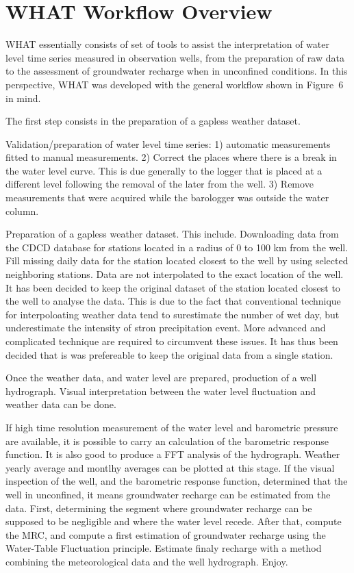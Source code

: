 \documentclass[12pt, letterpaper, fleqn]{report}
\begin{document}
\section{WHAT Workflow Overview}

WHAT essentially consists of set of tools to assist the interpretation of water level time series measured in observation wells, from the preparation of raw data to the assessment of groundwater recharge when in unconfined conditions. In this perspective, WHAT was developed with the general workflow shown in Figure 6  in mind.

The first step consists in the preparation of a gapless weather dataset.

Validation/preparation of water level time series: 1) automatic measurements fitted to manual measurements. 2) Correct the places where there is a break in the water level curve. This is due generally to the logger that is placed at a different level following the removal of the later from the well. 3) Remove measurements that were acquired while the barologger was outside the water column.

Preparation of a gapless weather dataset. This include. Downloading data from the CDCD database for stations located in a radius of 0 to 100 km from the well. Fill missing daily data for the station located closest to the well by using selected neighboring stations. Data are not interpolated to the exact location of the well. It has been decided to keep the original dataset of the station located closest to the well to analyse the data. This is due to the fact that conventional technique for interpoloating weather data tend to surestimate the number of wet day, but underestimate the intensity of stron precipitation event. More advanced and complicated technique are required to circumvent these issues. It has thus been decided that is was prefereable to keep the original data from a single station.

Once the weather data, and water level are prepared, production of a well hydrograph. Visual interpretation between the water level  fluctuation and weather data can be done.

If high time resolution measurement of the water level and barometric pressure are available, it is possible to carry an calculation of the barometric response function. It is also good to produce a FFT analysis of the hydrograph.
Weather yearly average and montlhy averages can be plotted at this stage.
If the visual inspection of the well, and the barometric response function, determined that the well in unconfined, it means groundwater recharge can be estimated from the data. First, determining the segment where groundwater recharge can be supposed to be negligible and where the water level recede. After that, compute the MRC, and compute a first estimation of groundwater recharge using the Water-Table Fluctuation principle. Estimate finaly recharge with a method combining the meteorological data and the well hydrograph. Enjoy.
\end{document}
